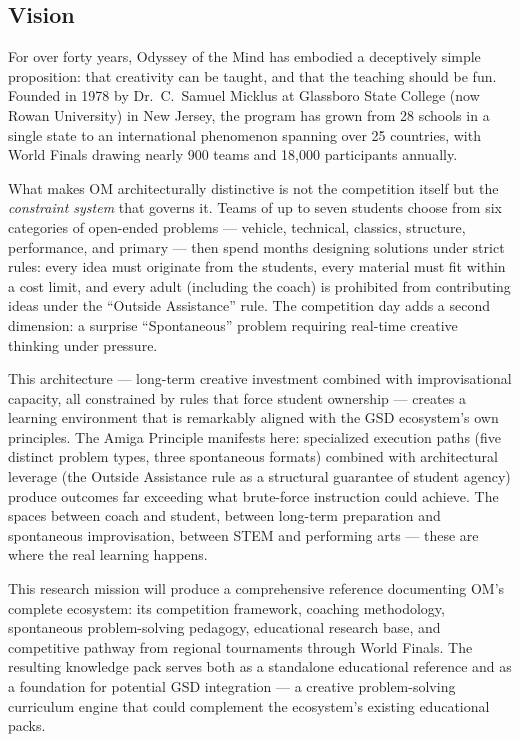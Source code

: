 \documentclass[11pt,letterpaper]{article}
\begin{document}
\subsection{Vision}

For over forty years, Odyssey of the Mind has embodied a deceptively simple proposition: that creativity can be taught, and that the teaching should be fun. Founded in 1978 by Dr.\ C.\ Samuel Micklus at Glassboro State College (now Rowan University) in New Jersey, the program has grown from 28 schools in a single state to an international phenomenon spanning over 25 countries, with World Finals drawing nearly 900 teams and 18,000 participants annually.

What makes OM architecturally distinctive is not the competition itself but the \emph{constraint system} that governs it. Teams of up to seven students choose from six categories of open-ended problems --- vehicle, technical, classics, structure, performance, and primary --- then spend months designing solutions under strict rules: every idea must originate from the students, every material must fit within a cost limit, and every adult (including the coach) is prohibited from contributing ideas under the ``Outside Assistance'' rule. The competition day adds a second dimension: a surprise ``Spontaneous'' problem requiring real-time creative thinking under pressure.

This architecture --- long-term creative investment combined with improvisational capacity, all constrained by rules that force student ownership --- creates a learning environment that is remarkably aligned with the GSD ecosystem's own principles. The Amiga Principle manifests here: specialized execution paths (five distinct problem types, three spontaneous formats) combined with architectural leverage (the Outside Assistance rule as a structural guarantee of student agency) produce outcomes far exceeding what brute-force instruction could achieve. The spaces between coach and student, between long-term preparation and spontaneous improvisation, between STEM and performing arts --- these are where the real learning happens.

This research mission will produce a comprehensive reference documenting OM's complete ecosystem: its competition framework, coaching methodology, spontaneous problem-solving pedagogy, educational research base, and competitive pathway from regional tournaments through World Finals. The resulting knowledge pack serves both as a standalone educational reference and as a foundation for potential GSD integration --- a creative problem-solving curriculum engine that could complement the ecosystem's existing educational packs.
\end{document}
